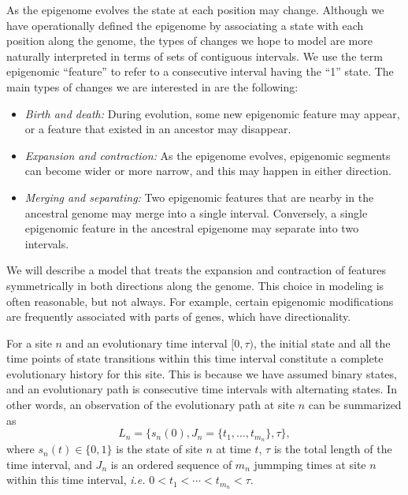 \documentclass[11pt]{article}
\begin{document}
As the epigenome evolves the state at each position may
change. Although we have operationally defined the epigenome by
associating a state with each position along the genome, the types of
changes we hope to model are more naturally interpreted in terms of
sets of contiguous intervals. We use the term epigenomic ``feature''
to refer to a consecutive interval having the ``1'' state. The
main types of changes we are interested in are the following:
\begin{itemize}
\item {\it Birth and death:} During evolution, some new epigenomic
  feature may appear, or a feature that existed in an ancestor may
  disappear. %
\item {\it Expansion and contraction:} As the epigenome evolves,
  epigenomic segments can become wider or more narrow, and this may
  happen in either direction.
\item {\it Merging and separating:} Two epigenomic features that are
  nearby in the ancestral genome may merge into a single interval.
  Conversely, a single epigenomic feature in the ancestral epigenome
  may separate into two intervals.
\end{itemize}
We will describe a model that treats the expansion and contraction of
features symmetrically in both directions along the genome.  This
choice in modeling is often reasonable, but not always. For example,
certain epigenomic modifications are frequently associated with parts
of genes, which have directionality.

For a site $n$ and an evolutionary time interval $[0,\tau)$, the initial
state and all the time points of state transitions within this time
interval constitute a complete evolutionary history for this
site. This is because we have assumed binary states, and an
evolutionary path is consecutive time intervals with alternating
states. In other words, an observation of the evolutionary path at site $n$
can be summarized as
\[
  L_n = \big\{s_n(0), J_n=\{t_1,\ldots,t_{m_n}\}, \tau \big\},
\]
where $s_n(t)\in\{0,1\}$ is the state of site $n$ at time $t$, $\tau$
is the total length of the time interval, and $J_n$ is an ordered
sequence of $m_n$ jummping times at site $n$ within this time
interval, \textit{i.e.} $0 < t_1 < \cdots < t_{m_n} < \tau$.
\end{document}
